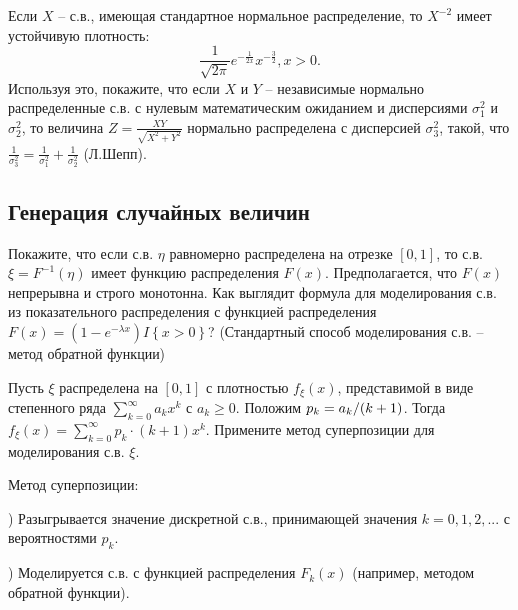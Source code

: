 \begin{problem}

Если $X$ -- с.в., имеющая стандартное нормальное распределение, то $X^{-2} $ имеет устойчивую плотность:
\[\frac{1}{\sqrt{2\pi } } e^{-\frac{1}{2x} } x^{-\frac{3}{2} } , x>0.\] 
Используя это, покажите, что если $X$ и $Y$ -- независимые нормально распределенные с.в. с нулевым математическим ожиданием и дисперсиями $\sigma _{1}^{2} $ и $\sigma _{2}^{2} $, то величина $Z=\frac{XY}{\sqrt{X^{2} +Y^{2} } } $ нормально распределена с дисперсией $\sigma _{3}^{2} $, такой, что $\frac{1}{\sigma _{3}^{2} } =\frac{1}{\sigma _{1}^{2} } +\frac{1}{\sigma _{2}^{2} } $ (Л.Шепп).

\end{problem}

\subsection{Генерация случайных величин}

\begin{problem}
Покажите, что если с.в. $\eta $ равномерно распределена на отрезке $\left[0,1\right]$, то с.в. $\xi =F^{-1} \left(\eta \right)$ имеет функцию распределения $F\left(x\right)$. Предполагается, что $F\left(x\right)$ непрерывна и строго монотонна. Как выглядит формула для моделирования с.в. из показательного распределения с функцией распределения $F\left(x\right)=\left(1-e^{-\lambda x} \right)I\left\{x>0\right\}$? (Стандартный способ моделирования с.в. -- метод обратной функции)
\end{problem}

\begin{problem}

Пусть $\xi $ распределена на $\left[0,1\right]$ с плотностью $f_{\xi } (x)$, представимой в виде степенного ряда $\sum _{k=0}^{\infty }a_{k} x^{k}  $ с $a_{k} \ge 0$. Положим $p_{k} ={a_{k} \mathord{\left/ {\vphantom {a_{k}  (k+1)}} \right. \kern-\nulldelimiterspace} (k+1)} $. Тогда $f_{\xi } (x)=\sum _{k=0}^{\infty }p_{k} \cdot (k+1)x^{k}  $. Примените метод суперпозиции для моделирования с.в. $\xi $.

\begin{ordre}
Метод суперпозиции:

) Разыгрывается значение дискретной с.в., принимающей значения $k=0,1,2,...$ с вероятностями $p_{k} $.

) Моделируется с.в. с функцией распределения $F_{k} (x)$ (например, методом обратной функции).

\end{ordre}

\end{problem}

